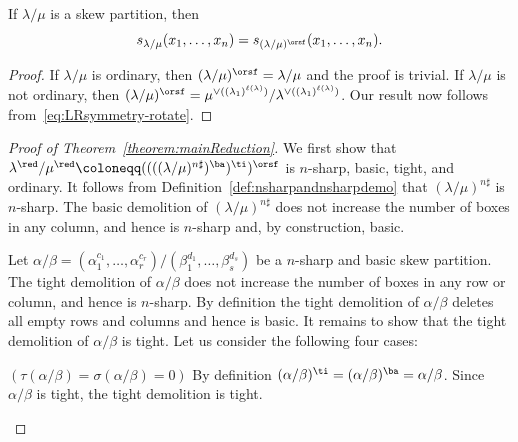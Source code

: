 \begin{prop}
\label{prop:reductionordinary}
If $\lambda / \mu$ is a skew partition, then 
\[
s_{\lambda / \mu}(x_1,\ldots,x_n) = s_{(\lambda / \mu)^{\orsf}}(x_1,\ldots,x_n).
\]
\end{prop}
\goodbreak
\begin{proof}
If $\lambda / \mu$ is ordinary, then $(\lambda / \mu)^{\orsf}=\lambda / \mu$ and the proof is trivial. If $\lambda / \mu$ is not ordinary, then $(\lambda / \mu)^{\orsf}= \mu^{\vee((\lambda_1)^{\ell(\lambda)})} / \lambda^{\vee((\lambda_1)^{\ell(\lambda)})}$. Our result now follows from~\eqref{eq:LRsymmetry-rotate}.%
\end{proof}

\begin{proof}[Proof of Theorem~\ref{theorem:mainReduction}]
We first show that $\lambda^{\red} / \mu^{\red} \coloneqq ((((\lambda / \mu)^{n\sharp})^{\ba })^{\ti })^{\orsf}$ is $n$-sharp, basic, tight, and ordinary. It follows from Definition~\ref{def:nsharpandnsharpdemo} that $(\lambda / \mu)^{n\sharp}$ is $n$-sharp. The basic demolition of $(\lambda / \mu)^{n\sharp}$ does not increase the number of boxes in any column, and hence is $n$-sharp and, by construction, basic.

Let $\alpha / \beta = (\alpha_1^{c_1},\ldots,\alpha_r^{c_r}) / (\beta_1^{d_1},\ldots,\beta_s^{d_s})$ be a $n$-sharp and basic skew partition. The tight demolition of $\alpha / \beta$ does not increase the number of boxes in any row or column, and hence is $n$-sharp. By definition the tight demolition of $\alpha / \beta$ deletes all empty rows and columns and hence is basic. It remains to show that the tight demolition of $\alpha / \beta$ is tight. Let us consider the following four cases:

\begin{Case}
{ $(\tau(\alpha/\beta) = \sigma(\alpha/\beta) = 0)$} By definition $(\alpha/\beta)^{\ti} = (\alpha/\beta)^{\ba} = \alpha/\beta$. Since $\alpha/\beta$ is tight, the tight demolition is tight. 
\end{Case}


\end{proof}
